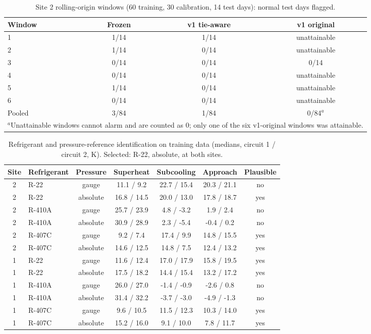 \begin{table}[h!]\centering\footnotesize\caption{Site 2 rolling-origin windows (60 training, 30 calibration, 14 test days): normal test days flagged.}\label{tab:S3b}
\begin{tabular}{lccc}\toprule
Window & Frozen & v1 tie-aware & v1 original\\\midrule
1 & 1/14 & 1/14 & unattainable\\
2 & 1/14 & 0/14 & unattainable\\
3 & 0/14 & 0/14 & 0/14\\
4 & 0/14 & 0/14 & unattainable\\
5 & 1/14 & 0/14 & unattainable\\
6 & 0/14 & 0/14 & unattainable\\
Pooled & 3/84 & 1/84 & 0/84$^{a}$\\
\multicolumn{4}{l}{\scriptsize $^{a}$Unattainable windows cannot alarm and are counted as 0; only one of the six v1-original windows was attainable.}\\
\bottomrule\end{tabular}\end{table}

\begin{table}[h!]\centering\footnotesize\caption{Refrigerant and pressure-reference identification on training data (medians, circuit 1 / circuit 2, K). Selected: R-22, absolute, at both sites.}\label{tab:S4}
\begin{tabular}{clcccc c}\toprule
Site & Refrigerant & Pressure & Superheat & Subcooling & Approach & Plausible\\\midrule
2 & R-22 & gauge & 11.1 / 9.2 & 22.7 / 15.4 & 20.3 / 21.1 & no\\
2 & R-22 & absolute & 16.8 / 14.5 & 20.0 / 13.0 & 17.8 / 18.7 & yes\\
2 & R-410A & gauge & 25.7 / 23.9 & 4.8 / -3.2 & 1.9 / 2.4 & no\\
2 & R-410A & absolute & 30.9 / 28.9 & 2.3 / -5.4 & -0.4 / 0.2 & no\\
2 & R-407C & gauge & 9.2 / 7.4 & 17.4 / 9.9 & 14.8 / 15.5 & yes\\
2 & R-407C & absolute & 14.6 / 12.5 & 14.8 / 7.5 & 12.4 / 13.2 & yes\\
1 & R-22 & gauge & 11.6 / 12.4 & 17.0 / 17.9 & 15.8 / 19.5 & yes\\
1 & R-22 & absolute & 17.5 / 18.2 & 14.4 / 15.4 & 13.2 / 17.2 & yes\\
1 & R-410A & gauge & 26.0 / 27.0 & -1.4 / -0.9 & -2.6 / 0.8 & no\\
1 & R-410A & absolute & 31.4 / 32.2 & -3.7 / -3.0 & -4.9 / -1.3 & no\\
1 & R-407C & gauge & 9.6 / 10.5 & 11.5 / 12.3 & 10.3 / 14.0 & yes\\
1 & R-407C & absolute & 15.2 / 16.0 & 9.1 / 10.0 & 7.8 / 11.7 & yes\\
\bottomrule\end{tabular}\end{table}

